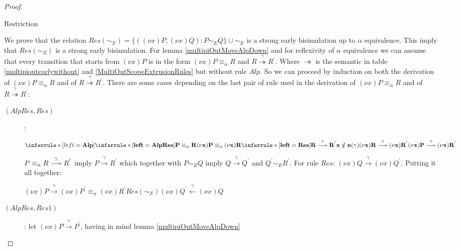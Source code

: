 \begin{lemma}
\begin{proof}
\begin{description}
	\end{description}
    \begin{description}
      \item[Restriction]
    \end{description}
      We prove that the relation $Res(\sim_{E})=\{((\nu x)P, (\nu x)Q): P\sim_{E} Q\} \cup \sim_{E}$ is a strong early bisimulation up to $\alpha$ equivalence. This imply that $Res(\sim_{E})$ is a strong early bisimulation. For lemma \ref{multipiOutMoveAlpDown} and for reflexivity of $\alpha$ equivalence we can assume that every transition that starts from $(\nu x)P$ is in the form $(\nu x)P \equiv_{\alpha} R$ and $R\stackrel{\gamma}{\twoheadrightarrow} R^{'}$. Where $\twoheadrightarrow$ is the semantic in table \ref{multipioutearlywithout} and \ref{MultiOutScopeExtrusionRules} but without rule $Alp$. So we can proceed by induction on both the derivation of $(\nu x)P \equiv_{\alpha} R$ and of $R\stackrel{\gamma}{\twoheadrightarrow} R^{'}$. There are some cases depending on the last pair of rule used in the derivation of $(\nu x)P \equiv_{\alpha} R$ and of $R\stackrel{\gamma}{\twoheadrightarrow} R^{'}$:
	\begin{description}
 	  \item[$(AlpRes, Res)$]:
   	    \begin{center}
   	      $\inferrule*[left=\bf{Alp}]{
		  \inferrule* [left=\bf{AlpRes}]{
		    P \equiv_{\alpha} R
		  }{
		    (\nu x)P \equiv_{\alpha} (\nu x)R
		  }
		\\
		  \inferrule* [left=\bf{Res}]{
		    R \stackrel{\gamma}{\longtwoheadrightarrow} R^{'}
		  \\
		    x \notin n(\gamma)
		  }{
		    (\nu x)R \stackrel{\gamma}{\longtwoheadrightarrow} (\nu x)R^{'}
		  }
	      }{
		(\nu x)P \stackrel{\gamma}{\longtwoheadrightarrow} (\nu x)R^{'}
	      }$
   	    \end{center}
 	    $P\equiv_{\alpha} R \stackrel{\gamma}{\longtwoheadrightarrow} R^{'}$ imply $P\xrightarrow{\gamma} R^{'}$ which together with $P\sim_{E}Q$ imply $Q \xrightarrow{\gamma} Q^{'}$ and $Q^{'} \sim_{E} R^{'}$. For rule $Res$: $(\nu x)Q \xrightarrow{\gamma} (\nu x)Q^{'}$. Putting it all together:
 	    \begin{center}
 	      $(\nu x)P \xrightarrow{\gamma} (\nu x)P^{'} \equiv_{\alpha} (\nu x)R^{'} Res(\sim_{E}) (\nu x)Q^{'} \stackrel{\gamma}{\leftarrow} (\nu x)Q$
 	    \end{center}
 	  \item[$(AlpRes, Res1)$]:
	    let $(\nu x)P \xrightarrow{\gamma} P^{'}$, having in mind lemma \ref{multipiOutMoveAlpDown} 

\end{description}
\end{proof}
\end{lemma}

